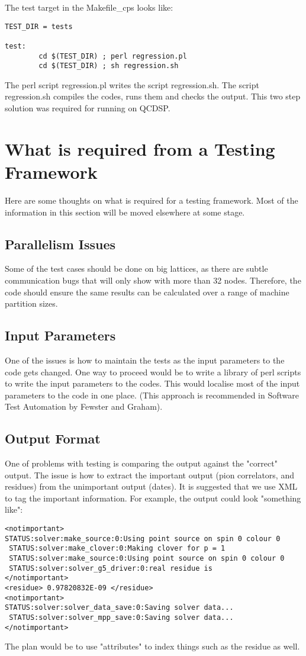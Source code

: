 \documentclass[12pt]{article}
\begin{document}
The test target in the Makefile\_cps looks like:
\begin{verbatim}
TEST_DIR = tests

test:
        cd $(TEST_DIR) ; perl regression.pl
        cd $(TEST_DIR) ; sh regression.sh
\end{verbatim}

The perl script regression.pl writes the script 
regression.sh. The script regression.sh compiles the codes,
runs them and checks the output. This two step solution
was required for running on QCDSP.

\section{What is required from a  Testing Framework}

Here are some thoughts on what is required for a testing
framework. Most of the information in this section will
be moved elsewhere at some stage.

\subsection{Parallelism Issues}
Some of the test cases should be done on big lattices, as there are subtle communication bugs that will only show with more than 32 nodes.  Therefore, the code should ensure the same results can be calculated over a range of machine partition sizes.

\subsection{Input Parameters}
One of the issues is how to maintain the tests 
as the input parameters to the code gets changed. One way to
proceed would be to write a library of perl scripts to write 
the input parameters to the codes. This would localise most of the 
input parameters to the code in one place. (This approach is 
recommended in Software Test Automation by Fewster and 
Graham).


\subsection{Output Format}
One of problems with testing is comparing the output against the "correct" output. The issue is how to extract the important output (pion correlators, and residues) from the unimportant output (dates).  It is suggested that we use XML to tag the important information. 
For example, the output could look "something like":
\begin{verbatim}
<notimportant>
STATUS:solver:make_source:0:Using point source on spin 0 colour 0
 STATUS:solver:make_clover:0:Making clover for p = 1
 STATUS:solver:make_source:0:Using point source on spin 0 colour 0
 STATUS:solver:solver_g5_driver:0:real residue is  
</notimportant>
<residue> 0.97820832E-09 </residue>
<notimportant>
STATUS:solver:solver_data_save:0:Saving solver data...
 STATUS:solver:solver_mpp_save:0:Saving solver data...
</notimportant>
\end{verbatim}
The plan would be to use "attributes" to index
things such as the residue as well.
\end{document}
